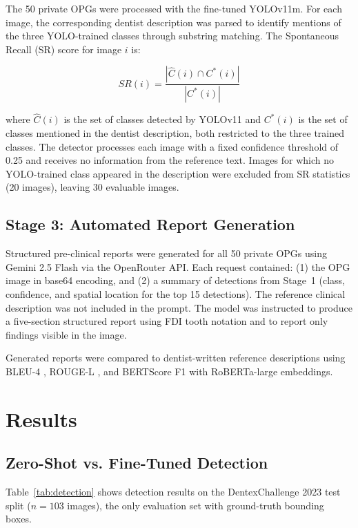 \documentclass[conference]{IEEEtran}
\begin{document}
The 50 private OPGs were processed with the fine-tuned YOLOv11m. For each image, the corresponding dentist description was parsed to identify mentions of the three YOLO-trained classes through substring matching. The Spontaneous Recall (SR) score for image $i$ is:

\begin{equation}
SR(i) = \frac{|\hat{C}(i) \cap C^{*}(i)|}{|C^{*}(i)|}
\label{eq:sr}
\end{equation}

where $\hat{C}(i)$ is the set of classes detected by YOLOv11 and $C^{*}(i)$ is the set of classes mentioned in the dentist description, both restricted to the three trained classes. The detector processes each image with a fixed confidence threshold of 0.25 and receives no information from the reference text. Images for which no YOLO-trained class appeared in the description were excluded from SR statistics (20 images), leaving 30 evaluable images.

\subsection{Stage 3: Automated Report Generation}

Structured pre-clinical reports were generated for all 50 private OPGs using Gemini 2.5 Flash via the OpenRouter API. Each request contained: (1) the OPG image in base64 encoding, and (2) a summary of detections from Stage~1 (class, confidence, and spatial location for the top 15 detections). The reference clinical description was not included in the prompt. The model was instructed to produce a five-section structured report using FDI tooth notation and to report only findings visible in the image.

Generated reports were compared to dentist-written reference descriptions using BLEU-4 \cite{papineni2002}, ROUGE-L \cite{lin2004}, and BERTScore F1 \cite{zhang2020bert} with RoBERTa-large embeddings.

\section{Results}

\subsection{Zero-Shot vs. Fine-Tuned Detection}

Table~\ref{tab:detection} shows detection results on the DentexChallenge 2023 test split ($n = 103$ images), the only evaluation set with ground-truth bounding boxes.
\end{document}
